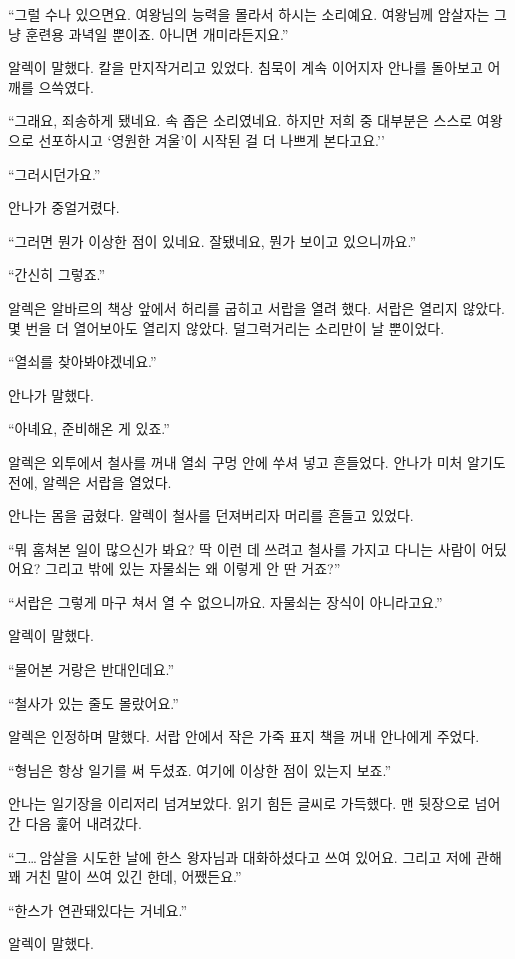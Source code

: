 ``그럴 수나 있으면요. 여왕님의 능력을 몰라서 하시는 소리예요. 여왕님께 암살자는 그냥 훈련용 과녁일 뿐이죠. 아니면 개미라든지요.''

알렉이 말했다. 칼을 만지작거리고 있었다. 침묵이 계속 이어지자 안나를 돌아보고 어깨를 으쓱였다.

``그래요, 죄송하게 됐네요. 속 좁은 소리였네요. 하지만 저희 중 대부분은 스스로 여왕으로 선포하시고 `영원한 겨울'이 시작된 걸 더 나쁘게 본다고요.''

``그러시던가요.''

안나가 중얼거렸다.

``그러면 뭔가 이상한 점이 있네요. 잘됐네요, 뭔가 보이고 있으니까요.''

``간신히 그렇죠.''

알렉은 알바르의 책상 앞에서 허리를 굽히고 서랍을 열려 했다. 서랍은 열리지 않았다. 몇 번을 더 열어보아도 열리지 않았다. 덜그럭거리는 소리만이 날 뿐이었다.

``열쇠를 찾아봐야겠네요.''

안나가 말했다.

``아녜요, 준비해온 게 있죠.''

알렉은 외투에서 철사를 꺼내 열쇠 구멍 안에 쑤셔 넣고 흔들었다. 안나가 미처 알기도 전에, 알렉은 서랍을 열었다.

안나는 몸을 굽혔다. 알렉이 철사를 던져버리자 머리를 흔들고 있었다.

``뭐 훔쳐본 일이 많으신가 봐요? 딱 이런 데 쓰려고 철사를 가지고 다니는 사람이 어딨어요? 그리고 밖에 있는 자물쇠는 왜 이렇게 안 딴 거죠?''

``서랍은 그렇게 마구 쳐서 열 수 없으니까요. 자물쇠는 장식이 아니라고요.''

알렉이 말했다.

`` 물어본 거랑은 반대인데요.''

``철사가 있는 줄도 몰랐어요.''

알렉은 인정하며 말했다. 서랍 안에서 작은 가죽 표지 책을 꺼내 안나에게 주었다.

``형님은 항상 일기를 써 두셨죠. 여기에 이상한 점이 있는지 보죠.''

안나는 일기장을 이리저리 넘겨보았다. 읽기 힘든 글씨로 가득했다. 맨 뒷장으로 넘어간 다음 훑어 내려갔다.

``그\ldots\,암살을 시도한 날에 한스 왕자님과 대화하셨다고 쓰여 있어요. 그리고 저에 관해 꽤 거친 말이 쓰여 있긴 한데, 어쨌든요.''

``한스가 연관돼있다는 거네요.''

알렉이 말했다.

